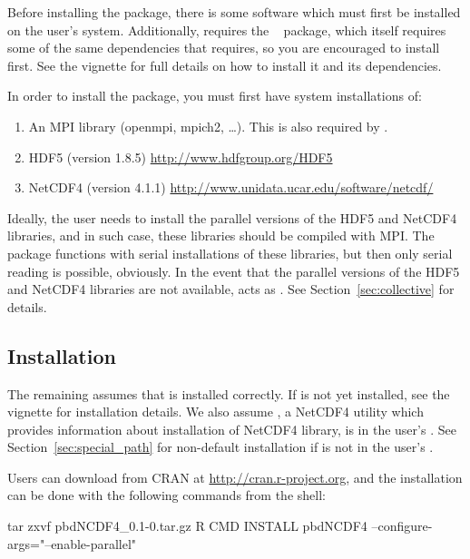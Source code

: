 Before installing the  package, there is some software which must first be installed on the user's system.  Additionally,  requires the ~\citep{Chen2012pbdMPIpackage} package, which itself requires some of the same dependencies that  requires, so you are encouraged to install  first.  See the  vignette \citep{Chen2012pbdMPIvignette} for full details on how to install it and its dependencies.

In order to install the  package, you must first have system installations of:
\begin{enumerate}
  \item An MPI library (openmpi, mpich2, \dots).  This is also required by .
  \item HDF5 (version 1.8.5) \url{http://www.hdfgroup.org/HDF5}
  \item NetCDF4 (version 4.1.1) \url{http://www.unidata.ucar.edu/software/netcdf/}
\end{enumerate}

Ideally, the user needs to install the parallel versions of the HDF5 and NetCDF4 libraries, and in such case, these libraries should be compiled with MPI.  The  package functions with serial installations of these libraries, but then only serial reading is possible, obviously.  In the event that the parallel versions of the HDF5 and NetCDF4 libraries are not available,  acts as . See Section~\ref{sec:collective} for details.




\subsection[Installation]{Installation}
\label{sec:installation}

The remaining assumes that  is installed correctly.
If  is not yet installed, see the 
vignette for installation details.
We also assume , a NetCDF4 utility which provides information about installation of NetCDF4 library, is in the user's .  See Section~\ref{sec:special_path} for non-default installation if  is not in the user's .

Users can download  from CRAN at
\url{http://cran.r-project.org}, and
the installation can be done with the following commands from the shell:
\begin{Command}
tar zxvf pbdNCDF4_0.1-0.tar.gz
R CMD INSTALL pbdNCDF4 --configure-args="--enable-parallel"
\end{Command}

